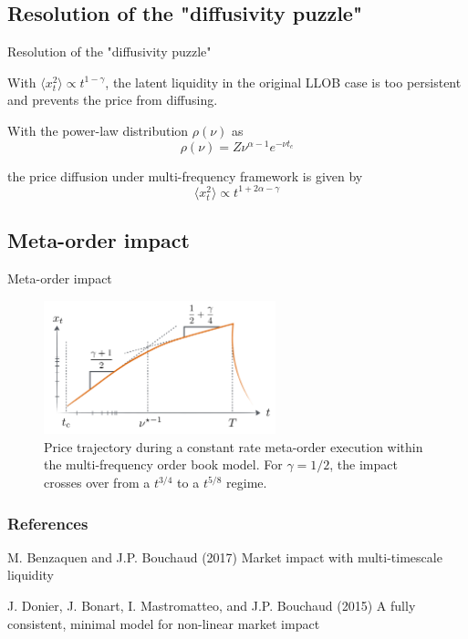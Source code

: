 \documentclass{beamer}
\begin{document}
\subsection{Resolution of the "diffusivity puzzle"}

\begin{frame}{Resolution of the "diffusivity puzzle"}

With $\langle x^2_t \rangle \propto t^{1-\gamma}$, the latent liquidity in the original LLOB case is too persistent and prevents the price from diffusing. \newline

With the power-law distribution $\rho(\nu)$ as
\begin{equation}
\rho(\nu)=Z\nu^{\alpha-1}e^{-\nu t_c}
\end{equation}

the price diffusion under multi-frequency framework is given by
\begin{equation}
\langle x_t^2 \rangle \propto t^{1+2\alpha-\gamma}
\end{equation}

\end{frame}

\subsection{Meta-order impact}

\begin{frame}{Meta-order impact}

\begin{figure}
\centering
\includegraphics[width=0.6\textwidth]{figure6.PNG}
\caption{\label{fig:f6}  Price trajectory during a constant rate meta-order execution within the multi-frequency order book model. For $\gamma = 1/2$, the impact crosses over from a $t^{3/4}$ to a $t^{5/8}$ regime.}
\end{figure}

\end{frame}

\begin{frame}

\frametitle{References}
\footnotesize{
\begin{thebibliography}{99} 
 M. Benzaquen and J.P. Bouchaud (2017)
\newblock Market impact with multi-timescale liquidity
\end{thebibliography}

\begin{thebibliography}{99} 
 J. Donier, J. Bonart, I. Mastromatteo, and J.P. Bouchaud (2015)
\newblock A fully consistent, minimal model for non-linear market impact
\end{thebibliography}
}

\end{frame}
\end{document}
